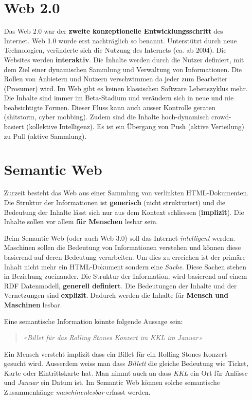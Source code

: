 \section{Web 2.0}

Das Web 2.0 war der \textbf{zweite konzeptionelle Entwicklungsschritt} des Internet. Web 1.0 wurde erst nachträglich so benannt. Unterstützt durch neue Technologien, veränderte sich die Nutzung des Internets (ca. ab 2004). Die Websites werden \textbf{interaktiv}. Die Inhalte werden durch die Nutzer definiert, mit dem Ziel einer dynamischen Sammlung und Verwaltung von Informationen. Die Rollen von Anbietern und Nutzern verschwimmen da jeder zum Bearbeiter (Prosumer) wird. Im Web gibt es keinen klassischen Software Lebenszyklus mehr. Die Inhalte sind immer im Beta-Stadium und verändern sich in neue und nie beabsichtigte Formen. Dieser Fluss kann auch ausser Kontrolle geraten (shitstorm, cyber mobbing). Zudem sind die Inhalte hoch-dynamisch crowd-basiert (kollektive Intelligenz). Es ist ein Übergang von Push (aktive Verteilung) zu Pull (aktive Sammlung).

\section{Semantic Web}

Zurzeit besteht das Web aus einer Sammlung von verlinkten HTML-Dokumenten. Die Struktur der Informationen ist \textbf{generisch} (nicht strukturiert) und die Bedeutung der Inhalte lässt sich nur aus dem Kontext schliessen (\textbf{implizit}). Die Inhalte sollen vor allem \textbf{für Menschen} lesbar sein.

Beim Semantic Web (oder auch Web 3.0) soll das Internet \textit{intelligent} werden. Maschinen sollen die Bedeutung von Informationen verstehen und können diese basierend auf deren Bedeutung verarbeiten. Um dies zu erreichen ist der primäre Inhalt nicht mehr ein HTML-Dokument sondern eine \textit{Sache}. Diese Sachen stehen in Beziehung zueinander. Die Struktur der Information, wird basierend auf einem RDF Datenmodell, \textbf{generell definiert}. Die Bedeutungen der Inhalte und der Vernetzungen sind \textbf{explizit}. Dadurch werden die Inhalte für \textbf{Mensch und Maschinen} lesbar.

Eine semantische Information könnte folgende Aussage sein:
\begin{quote}
	\textit{«Billet für das Rolling Stones Konzert im KKL im Januar»}
\end{quote}
Ein Mensch versteht implizit dass ein Billet für ein Rolling Stones Konzert gesucht wird. Ausserdem weiss man dass \textit{Billett} die gleiche Bedeutung wie Ticket, Karte oder Eintrittskarte hat. Man nimmt auch an dass \textit{KKL} ein Ort für Anlässe und \textit{Januar} ein Datum ist. Im Semantic Web können solche semantische Zusammenhänge \textit{maschinenlesbar} erfasst werden.


